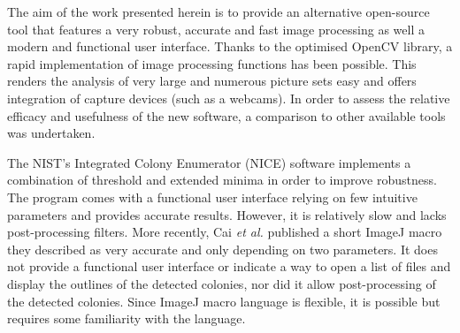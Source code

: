 \documentclass[10pt]{article}
\begin{document}
The aim of the work presented herein is to provide an alternative open-source tool that
features a very robust, accurate and fast image processing as well a modern and
functional user interface. Thanks to the optimised OpenCV
library\cite{opencv_library}, a rapid implementation of image processing
functions has been possible. This renders the analysis of very large and
numerous picture sets easy and offers integration of capture devices 
(such as a webcams). 
In order to assess the relative efficacy and usefulness of the new software,
a comparison to other available tools was undertaken.


The NIST's Integrated Colony Enumerator (NICE)\cite{clarke_lowcost_2010}
software
{
implements a combination of threshold and extended minima in order to improve robustness.
The program comes with a functional user interface relying on few intuitive parameters
and provides accurate results. 
}
However, it is relatively slow and lacks
post-processing filters.
More recently, Cai \emph{et al.} published\cite{cai_optimized_2011} a short
ImageJ macro they described as very accurate and only depending on two parameters.
It does not provide a functional user interface or indicate a way to open a list
of files and display the outlines of the detected colonies, nor did it allow
post-processing of the detected colonies. 
{
Since ImageJ macro language is
flexible, it is possible but requires some familiarity with the language.
}
\end{document}
